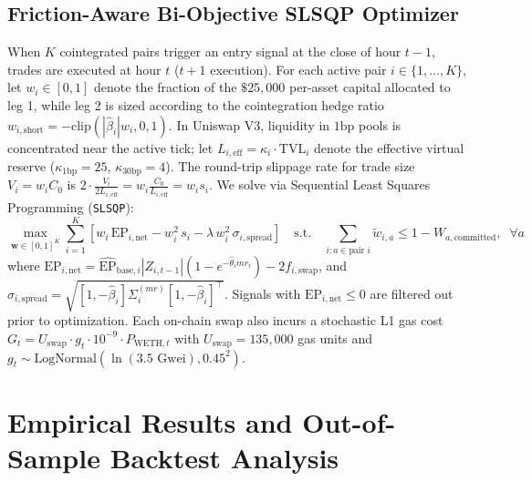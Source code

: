 \documentclass[11pt,a4paper]{article}
\begin{document}
\subsection{Friction-Aware Bi-Objective SLSQP Optimizer}
When $K$ cointegrated pairs trigger an entry signal at the close of hour $t-1$, trades are executed at hour $t$ ($t+1$ execution). For each active pair $i \in \{1,\dots,K\}$, let $w_i \in [0, 1]$ denote the fraction of the $\$25,000$ per-asset capital allocated to leg 1, while leg 2 is sized according to the cointegration hedge ratio $w_{i,\text{short}} = -\text{clip}(|\hat{\beta}_i| w_i, 0, 1)$. In Uniswap V3, liquidity in $1\text{bp}$ pools is concentrated near the active tick; let $L_{i,\text{eff}} = \kappa_i \cdot \text{TVL}_i$ denote the effective virtual reserve ($\kappa_{1\text{bp}} = 25$, $\kappa_{30\text{bp}} = 4$). The round-trip slippage rate for trade size $V_i = w_i C_0$ is $2 \cdot \frac{V_i}{2 L_{i,\text{eff}}} = w_i \frac{C_0}{L_{i,\text{eff}}} = w_i s_i$. We solve via Sequential Least Squares Programming (\texttt{SLSQP}):
\begin{equation}
\max_{\mathbf{w} \in [0,1]^K} \sum_{i=1}^K \left[ w_i \, \text{EP}_{i,\text{net}} - w_i^2 \, s_i - \lambda \, w_i^2 \, \sigma_{i,\text{spread}} \right] \quad \text{s.t.} \quad \sum_{i : a \in \text{pair } i} \tilde{w}_{i,a} \le 1 - W_{a,\text{committed}}, \;\; \forall a
\end{equation}
where $\text{EP}_{i,\text{net}} = \widehat{\text{EP}}_{\text{base},i} |Z_{i,t-1}| (1 - e^{-\hat{\theta}_i mr_i}) - 2 f_{i,\text{swap}}$, and $\sigma_{i,\text{spread}} = \sqrt{[1, -\hat{\beta}_i] \Sigma_i^{(mr)} [1, -\hat{\beta}_i]^\top}$. Signals with $\text{EP}_{i,\text{net}} \le 0$ are filtered out prior to optimization. Each on-chain swap also incurs a stochastic L1 gas cost $G_t = U_{\text{swap}} \cdot g_t \cdot 10^{-9} \cdot P_{\text{WETH},t}$ with $U_{\text{swap}} = 135,000$ gas units and $g_t \sim \text{LogNormal}(\ln(3.5\text{ Gwei}), 0.45^2)$.
\section{Empirical Results and Out-of-Sample Backtest Analysis}
\end{document}

